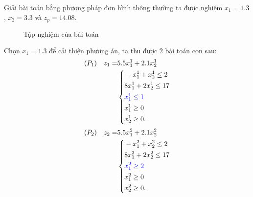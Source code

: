 \documentclass[12pt,a4paper]{report}
\begin{document}
    Giải bài toán bằng phương pháp đơn hình thông thường ta được nghiệm $x_1 =1.3$, $x_2 = 3.3$ và $z_p=14.08$.
    \vspace{1cm}
    \begin{figure}
	\center
    \caption{Tập nghiệm của bài toán}
    \end{figure}



Chọn $x_1=1.3$ để cải thiện phương án, ta thu được 2 bài toán con sau:
    \begin{equation*}
        \begin{split}
            (P_1) \quad z_1= & 5.5x^1_1 + 2.1x^1_2 \\
            & \left\{\begin{split}
            & -x^1_1 + x^1_2 \leq 2 \\
            & 8x^1_1 + 2x^1_2 \leq 17 \\
            & \color{blue} x^1_1 \leq 1 \\
            &x^1_1 \geq 0 \\
            &x^1_2 \geq 0. \\
            \end{split}\right. \\
        \end{split}
    \end{equation*}
   \begin{equation*}
        \begin{split}
            (P_2) \quad z_2= & 5.5x^2_1 + 2.1x^2_2  \\
            & \left\{\begin{split}
            & -x^2_1 + x^2_2 \leq 2 \\
            & 8x^2_1 + 2x^2_2 \leq 17 \\
            & \color{blue} x^2_1 \geq 2 \\
            &x^2_1 \geq 0 \\
            &x^2_2 \geq 0. \\
            \end{split}\right. \\
        \end{split}
    \end{equation*}
\end{document}
